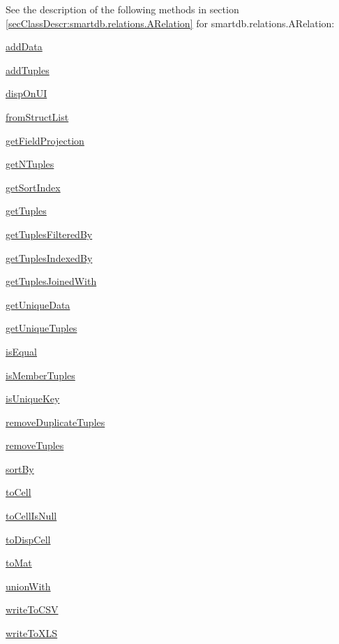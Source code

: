 See the description of the following methods in section \ref{secClassDescr:smartdb.relations.ARelation}
 for smartdb.relations.ARelation:

\begin{list}{}{}
 \item \hyperref[method:smartdb.relations.ARelation.addData]{addData}
 \item \hyperref[method:smartdb.relations.ARelation.addTuples]{addTuples}
 \item \hyperref[method:smartdb.relations.ARelation.dispOnUI]{dispOnUI}
 \item \hyperref[method:smartdb.relations.ARelation.fromStructList]{fromStructList}
 \item \hyperref[method:smartdb.relations.ARelation.getFieldProjection]{getFieldProjection}
 \item \hyperref[method:smartdb.relations.ARelation.getNTuples]{getNTuples}
 \item \hyperref[method:smartdb.relations.ARelation.getSortIndex]{getSortIndex}
 \item \hyperref[method:smartdb.relations.ARelation.getTuples]{getTuples}
 \item \hyperref[method:smartdb.relations.ARelation.getTuplesFilteredBy]{getTuplesFilteredBy}
 \item \hyperref[method:smartdb.relations.ARelation.getTuplesIndexedBy]{getTuplesIndexedBy}
 \item \hyperref[method:smartdb.relations.ARelation.getTuplesJoinedWith]{getTuplesJoinedWith}
 \item \hyperref[method:smartdb.relations.ARelation.getUniqueData]{getUniqueData}
 \item \hyperref[method:smartdb.relations.ARelation.getUniqueTuples]{getUniqueTuples}
 \item \hyperref[method:smartdb.relations.ARelation.isEqual]{isEqual}
 \item \hyperref[method:smartdb.relations.ARelation.isMemberTuples]{isMemberTuples}
 \item \hyperref[method:smartdb.relations.ARelation.isUniqueKey]{isUniqueKey}
 \item \hyperref[method:smartdb.relations.ARelation.removeDuplicateTuples]{removeDuplicateTuples}
 \item \hyperref[method:smartdb.relations.ARelation.removeTuples]{removeTuples}
 \item \hyperref[method:smartdb.relations.ARelation.sortBy]{sortBy}
 \item \hyperref[method:smartdb.relations.ARelation.toCell]{toCell}
 \item \hyperref[method:smartdb.relations.ARelation.toCellIsNull]{toCellIsNull}
 \item \hyperref[method:smartdb.relations.ARelation.toDispCell]{toDispCell}
 \item \hyperref[method:smartdb.relations.ARelation.toMat]{toMat}
 \item \hyperref[method:smartdb.relations.ARelation.unionWith]{unionWith}
 \item \hyperref[method:smartdb.relations.ARelation.writeToCSV]{writeToCSV}
 \item \hyperref[method:smartdb.relations.ARelation.writeToXLS]{writeToXLS}
\end{list}

